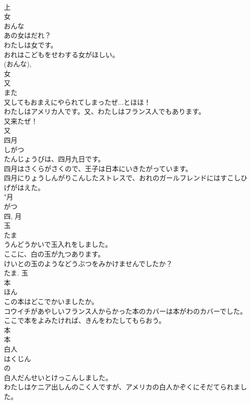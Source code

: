 \documentclass[8pt]{extreport}
\begin{document}
\begin{CJK}{UTF8}{min}
\\	上	
\\	女	
\\	おんな	
\\	あの女はだれ？	
\\	わたしは女です。	
\\	おれはこどもをせわする女がほしい。	
\\	(おんな), 
\\	女	
\\	又	
\\	また	
\\	又してもおまえにやられてしまったぜ...とほほ！	
\\	わたしはアメリカ人です。又、わたしはフランス人でもあります。	
\\	又来たぜ！	
\\	又	
\\	四月	
\\	しがつ	
\\	たんじょうびは、四月九日です。	
\\	四月はさくらがさくので、王子は日本にいきたがっています。	
\\	四月にりょうしんがりこんしたストレスで、おれのガールフレンドにはすこしひげがはえた。	
\\	"月 
\\	がつ 
\\	四, 月	
\\	玉	
\\	たま	
\\	うんどうかいで玉入れをしました。	
\\	ここに、白の玉が九つあります。	
\\	けいとの玉のようなどうぶつをみかけませんでしたか？	
\\	たま.	玉	
\\	本	
\\	ほん	
\\	この本はどこでかいましたか。	
\\	コウイチがあやしいフランス人からかった本のカバーは本がわのカバーでした。	
\\	ここで本をよみたければ、きんをわたしてもらおう。	
\\	本 
\\	本	
\\	白人	
\\	はくじん	
\\	の 
\\	白人だんせいとけっこんしました。	
\\	わたしはケニア出しんのこく人ですが、アメリカの白人かぞくにそだてられました。	

\end{CJK}
\end{document}
